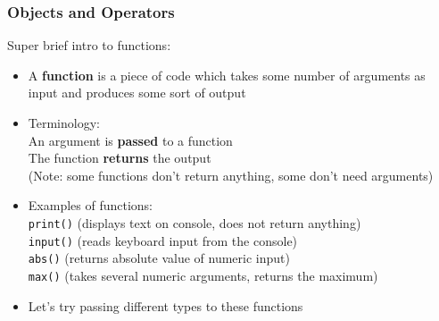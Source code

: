 \documentclass{beamer}
\newcommand{\code}[1]{\texttt{#1}}
\begin{document}
\begin{frame}%
	\frametitle{Objects and Operators}
	
	\begin{alertblock}{Super brief intro to functions:}
			\begin{itemize}
				\item A \textbf{function} is a piece of code which takes some number of arguments as input and produces some sort of output
				\item Terminology: \\
						An argument is \textbf{passed} to a function \\
						The function \textbf{returns} the output \\
						(Note: some functions don't return anything, some don't need arguments)
				\item Examples of functions: \\
						\code{print()} (displays text on console, does not return anything) \\
						\code{input()} (reads keyboard input from the console) \\
						\code{abs()} (returns absolute value of numeric input) \\
						\code{max()} (takes several numeric arguments, returns the maximum)
				\item Let's try passing different types to these functions
			\end{itemize}
	\end{alertblock}
	
\end{frame}
\end{document}
